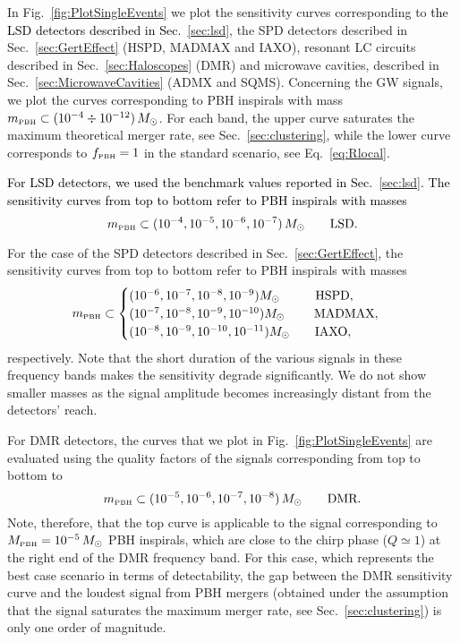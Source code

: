 \documentclass[11pt,a4paper]{article}
\newcommand{\PBH}{\text{\tiny PBH}}
\begin{document}
In Fig.~\ref{fig:PlotSingleEvents} we plot the sensitivity curves corresponding to \textcolor{black}{the LSD detectors described in Sec.~\ref{sec:lsd}}, the SPD detectors described in Sec.~\ref{sec:GertEffect} (HSPD, MADMAX and IAXO), resonant LC circuits described in Sec.~\ref{sec:Haloscopes} (DMR) and microwave cavities, described in Sec.~\ref{sec:MicrowaveCavities} (ADMX and SQMS). Concerning the GW signals, we plot the curves corresponding to PBH inspirals with mass $m_\text{\tiny PBH} \subset (10^{-4} \div 10^{-12}) \, M_\odot$. For each band, the upper curve saturates the maximum theoretical merger rate, see Sec.~\ref{sec:clustering}, while the lower curve corresponds to $f_\text{\tiny PBH} = 1$ in the standard scenario, see Eq.~\eqref{eq:Rlocal}.

\textcolor{black}{For LSD detectors, we used the benchmark values reported in Sec.~\ref{sec:lsd}. The sensitivity curves from top to bottom refer to PBH inspirals with masses
\begin{equation}
m_\PBH\subset (10^{-4},10^{-5}, 10^{-6}, 10^{-7}) \, M_\odot \qquad \text{LSD}.
\end{equation}}

For the case of the SPD detectors described in Sec.~\ref{sec:GertEffect}, the sensitivity curves from top to bottom refer to PBH inspirals with masses
\begin{equation}
m_\text{\tiny PBH}\subset  
\begin{cases}
(10^{-6}, 10^{-7}, 10^{-8}, 10^{-9}) M_\odot \qquad \,\,\,\,\, \text{HSPD}, \\
(10^{-7}, 10^{-8}, 10^{-9}, 10^{-10})M_\odot \qquad \,\,\text{MADMAX}, \\
(10^{-8}, 10^{-9}, 10^{-10}, 10^{-11})M_\odot \qquad \text{IAXO}, 
\end{cases}
\end{equation}
respectively. Note that the short duration of the various signals in these frequency bands makes the sensitivity degrade significantly. 
We do not show smaller masses as the signal amplitude becomes increasingly distant from the detectors' reach.




For DMR detectors, the curves that we plot in Fig.~\ref{fig:PlotSingleEvents} are evaluated using the quality factors of the signals corresponding from top to bottom to 
\begin{equation}
m_\PBH\subset (10^{-5}, 10^{-6}, 10^{-7}, 10^{-8}) \, M_\odot \qquad \text{DMR}.
\end{equation}
Note, therefore, that the top curve is applicable to the signal corresponding to
$M_\text{\tiny PBH} = 10^{-5} \, M_\odot$ PBH inspirals, which are close to the chirp phase ($Q \simeq 1$) at the right end of the DMR frequency band. For this case, which represents the best case scenario in terms of detectability, the gap between the DMR sensitivity curve and the loudest signal from PBH mergers (obtained under the assumption that the signal saturates the maximum merger rate, see Sec.~\ref{sec:clustering}) is only one order of magnitude.
\end{document}
